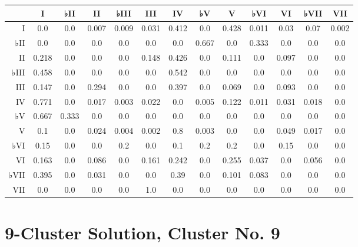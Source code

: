 \begin{table}[htbp]
\begin{minipage}{\linewidth}
\setlength{\tymax}{0.5\linewidth}
\centering
\small
\begin{tabulary}{\textwidth}{@{}RCCCCCCCCCCCC@{}} \toprule
&I&♭II&II&♭III&III&IV&♭V&V&♭VI&VI&♭VII&VII\\
\midrule
I&0.0&0.0&0.007&0.009&0.031&0.412&0.0&0.428&0.011&0.03&0.07&0.002\\
♭II&0.0&0.0&0.0&0.0&0.0&0.0&0.667&0.0&0.333&0.0&0.0&0.0\\
II&0.218&0.0&0.0&0.0&0.148&0.426&0.0&0.111&0.0&0.097&0.0&0.0\\
♭III&0.458&0.0&0.0&0.0&0.0&0.542&0.0&0.0&0.0&0.0&0.0&0.0\\
III&0.147&0.0&0.294&0.0&0.0&0.397&0.0&0.069&0.0&0.093&0.0&0.0\\
IV&0.771&0.0&0.017&0.003&0.022&0.0&0.005&0.122&0.011&0.031&0.018&0.0\\
♭V&0.667&0.333&0.0&0.0&0.0&0.0&0.0&0.0&0.0&0.0&0.0&0.0\\
V&0.1&0.0&0.024&0.004&0.002&0.8&0.003&0.0&0.0&0.049&0.017&0.0\\
♭VI&0.15&0.0&0.0&0.2&0.0&0.1&0.2&0.2&0.0&0.15&0.0&0.0\\
VI&0.163&0.0&0.086&0.0&0.161&0.242&0.0&0.255&0.037&0.0&0.056&0.0\\
♭VII&0.395&0.0&0.031&0.0&0.0&0.39&0.0&0.101&0.083&0.0&0.0&0.0\\
VII&0.0&0.0&0.0&0.0&1.0&0.0&0.0&0.0&0.0&0.0&0.0&0.0\\

\bottomrule

\end{tabulary}
\end{minipage}
\end{table}

\section{9-Cluster Solution, Cluster No. 9}
\label{9-clustersolutionclusterno.9}

